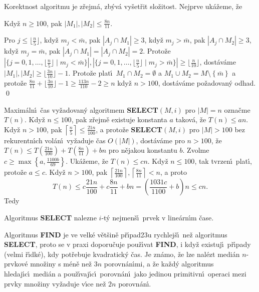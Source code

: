\flushpar Korektnost algoritmu je z\v rejm\'a, zb\'yv\'a vy\v set\v rit 
slo\v zitost. Nej\-prve uk\'a\v zeme, \v ze

Kdy\v z $n\ge 100$, pak $|M_1|,|M_2|\le\frac {8n}{
11}$.
\endproclaim

 Pro $j\le\lfloor\frac n5\rfloor$, kdy\v z $
m_j<\bar {m}$, pak 
$|A_j\cap M_1|\ge 3$, kdy\v z $m_j>\bar {m}$, pak $|A_j\cap M_2|\ge 
3$, kdy\v z $m_j=\bar {m}$, 
pak $|A_j\cap M_1|=|A_j\cap M_2|=2$.  Proto\v ze 
$|\{j=0,1,\dots,\lfloor\frac n5\rfloor\mid m_j<\bar {m}\}|,|\{j=0
,1,\dots,\lfloor\frac n5\rfloor\mid m_j>\bar {m}\}|\ge\lfloor\frac 
n{10}\rfloor$, 
dost\'av\'ame $|M_1|,|M_2|\ge\lfloor\frac {3n}{10}\rfloor -1$.  Proto\v ze plat\'\i\ $
M_1\cap M_2=\emptyset$ 
a $M_1\cup M_2=M\setminus \left\{\bar {m}\right\}$ a proto\v ze $\frac {8n}{
11}+\lfloor\frac {3n}{10}\rfloor -1\ge\frac {113n}{110}-2\ge n$ 
kdy\v z $n>100$, dost\'av\'ame po\v zadovan\'y odhad. \qed
\enddemo

\flushpar Maxim\'aln\'\i\ \v cas vy\v zadovan\'y algoritmem  
{\bf SELECT$\left(M,i\right)$} pro $|M|=n$ ozna\v cme $T\left(n\right)$.  Kdy\v z $n\le 
100$, pak z\v rejm\v e 
exis\-tuje konstanta $a$ takov\'a, \v ze $T\left(n\right)\le an$.  Kdy\v z $
n>100$, 
pak $\left\lceil\frac n5\right\rceil\le\frac {21n}{100}$, a proto\v ze {\bf SELECT$
\left(M,i\right)$} pro $|M|>100$ bez 
rekurentn\'\i ch vol\'an\'\i\ vy\v zaduje \v cas $O\left(|M|\right)$, dost\'av\'ame pro 
$n>100$, \v ze $T\left(n\right)\le T\left(\frac {21n}{100}\right)+T\left(\frac {8n}{11}\right)+bn$ pro n\v ejakou konstantu 
$b$.  Zvolme $c\ge\max\left\{a,\frac {1100b}{69}\right\}$. Uk\'a\v zeme, \v ze $
T\left(n\right)\le cn$.  
Kdy\v z $n\le 100$, tak tvrzen\'\i\ plat\'\i , proto\v ze $a\le c$.  Kdy\v z 
$n>100$, pak $\left\lceil\frac {21n}{100}\right\rceil ,\left\lceil\frac {8n}{11}\right\rceil 
<n$, a proto 
$$T\left(n\right)\le c\frac {21n}{100}+c\frac {8n}{11}+bn=\left(\frac {1031c}{110
0}+b\right)n\le cn.$$
Tedy
\medskip

Algoritmus {\bf SELECT} nalezne $i$-t\'y nejmen\v s\'\i\ 
prvek v line\'arn\'\i m \v case.
\endproclaim

\flushpar Algoritmus {\bf FIND} je ve velk\'e v\v et\v sin\v e 
p\v r\'\i pad\accent23u 
rychlej\v s\'\i\ ne\v z algoritmus {\bf SELECT}, proto se v praxi 
doporu\v cuje pou\v z\'\i vat {\bf FIND}, i kdy\v z existuj\'\i\ 
p\v r\'\i pady (velmi \v r\'\i dk\'e), kdy pot\v rebuje kvadratick\'y \v cas.
Je zn\'amo, \v ze lze nal\'ezt medi\'an $n$-prvkov\'e mno\v ziny s 
m\'en\v e ne\v z $3n$ porov\-n\'an\'\i mi, a \v ze ka\v zd\'y algoritmus hledaj\'\i c\'\i\ 
medi\'an a pou\v z\'\i vaj\'\i c\'\i\ porov\-n\'an\'\i\ jako jedinou primi\-tivn\'\i\ 
operaci mezi prvky mno\v ziny vy\v zaduje v\'\i ce ne\v z $2n$ 
porov\-n\'an\'\i .
\medskip

